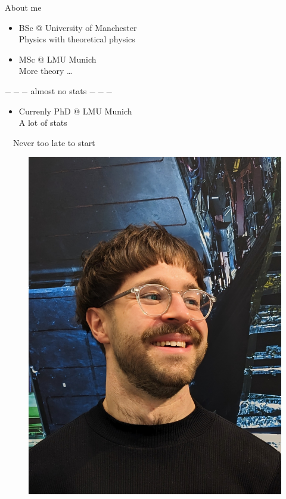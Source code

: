 \documentclass[
aspectratio=169,
14pt,
professionalfonts
]{beamer}
\newcommand{\arrow}{~\ding{220}~}
\begin{document}
\begin{frame}{About me}
    \begin{minipage}{0.69\textwidth}
        \begin{itemize}
            \item BSc @ University of Manchester \\
                Physics with theoretical physics\\
            \item MSc @ LMU Munich \\
                More theory \ldots
        \end{itemize}
        \begin{center}
            $---$ almost no stats $---$
        \end{center}
        \begin{itemize}
            \item Currenly PhD @ LMU Munich\\
                A lot of stats
        \end{itemize}
        \arrow Never too late to start
    \end{minipage}
    \begin{minipage}{0.3\textwidth}
        \begin{figure}
            \center
            \includegraphics[width=\textwidth]{../plots/port.jpg}
        \end{figure}
    \end{minipage}
\end{frame}
\end{document}
